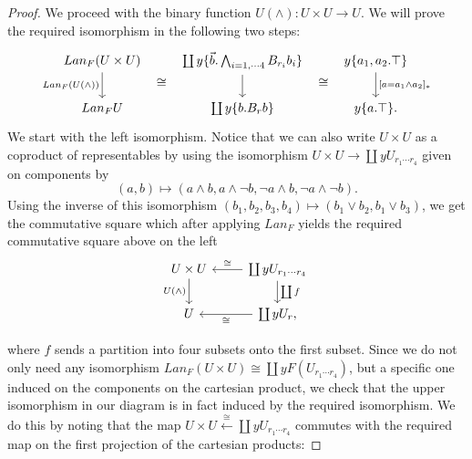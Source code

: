 \documentclass[a4paper]{amsproc}
\theoremstyle{plain}
\theoremstyle{definition}
\theoremstyle{remark}
\numberwithin{equation}{section}
\begin{document}
\begin{proof}
We proceed with the binary function $U(\wedge): U \times U \to U$. We will prove the required isomorphism in the following two steps:
\[
\begin{tikzcd}
Lan_F(U \times U) \arrow[d, "Lan_F(U(\wedge))"'] \arrow[r, phantom, shift right=7, "\cong"] & {\coprod y \{\vec{b}.\bigwedge_{i=1,\cdots 4} B_{r_i} b_i\}} \arrow[d] \arrow[r, phantom, shift right=7, "\cong"] & {y \{a_1,a_2.\top\}} \arrow[d, "{[a = a_1 \wedge a_2]_*}"] \\
Lan_F U                                          & \coprod y \{b.B_rb\} & y\{a.\top\} .
\end{tikzcd}
\]
We start with the left isomorphism. Notice that we can also write $U \times U$ as a coproduct of representables by using the isomorphism $U \times U \to \coprod y U_{r_1 \cdots r_4}$ given on components by 
\[
(a,b) \mapsto (a \wedge b, a \wedge \neg b, \neg a \wedge b, \neg a \wedge \neg b) .
\]
Using the inverse of this isomorphism $(b_1,b_2,b_3,b_4) \mapsto (b_1 \vee b_2, b_1 \vee b_3)$, we get the commutative square which after applying $Lan_F$ yields the required commutative square above on the left
\[
\begin{tikzcd}
U \times U \arrow[d, "U(\wedge)"'] & \coprod y U_{r_1 \cdots r_4} \arrow[d, "\coprod f"] \arrow[l, "\cong"'] \\
U                                  & \coprod y U_r \arrow[l, "\cong"]                          ,
\end{tikzcd}
\]

where $f$ sends a partition into four subsets onto the first subset. Since we do not only need any isomorphism $Lan_F (U \times U) \cong \coprod y F (U_{r_1 \cdots r_4})$, but a specific one induced on the components on the cartesian product, we check that the upper isomorphism in our diagram is in fact induced by the required isomorphism. We do this by noting that the map $U \times U \xleftarrow{\cong} \coprod y U_{r_1 \cdots r_4}$ commutes with the required map on the first projection of the cartesian products:


\end{proof}
\end{document}
